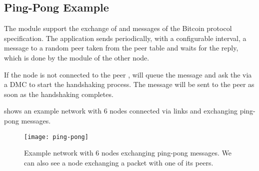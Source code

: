 \subsection{Ping-Pong Example}\label{subsec:ping-pong}

The  module support the exchange of  and 
messages of the Bitcoin protocol specification. The application sends
periodically, with a configurable interval, a  message to a random
peer taken from the peer table and waits for the  reply, which is
done by the  module of the other node.

If the node is not connected to the peer ,  will queue the 
message and ask the  via a DMC to start the handshaking
process. The  message will be sent to the peer as soon as the
handshaking completes.

 shows an example network with 6 nodes connected via
\omnetpp{} links and exchanging ping-pong messages.

\begin{figure}[tbhp]
	\centering
	\texttt{[image: ping-pong]}
	\caption{Example network with 6 nodes exchanging ping-pong
	messages. We can also see a node exchanging a  packet
	with one of its peers.}\label{fig:ping-pong}
\end{figure}

